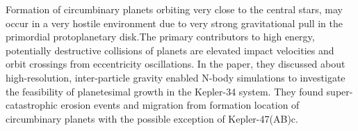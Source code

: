 Formation of circumbinary planets orbiting very close to the central stars, may occur in a very hostile environment due to very strong gravitational pull in the primordial protoplanetary disk.The primary contributors to high energy, potentially destructive collisions of planets are elevated impact velocities and orbit crossings from eccentricity oscillations. In the paper, they discussed about high-resolution, inter-particle gravity enabled N-body simulations to investigate the feasibility of planetesimal growth in the Kepler-34 system. They found super-catastrophic erosion events and  migration from formation location of circumbinary planets with the possible exception of Kepler-47(AB)c.
